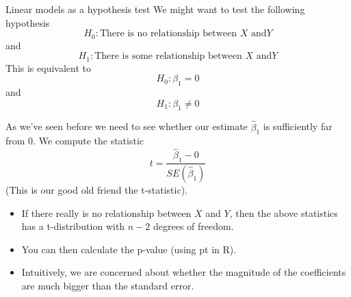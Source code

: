 \documentclass{bredelebeamer}
\begin{document}
\begin{frame}{Linear models as a hypothesis test}
We might want to test the following hypothesis
\begin{equation}
H_0: \text{There is no relationship between } X \text{ and} Y 
\end{equation}
and
\begin{equation}
H_1: \text{There is some relationship between } X \text{ and} Y 
\end{equation}
This is equivalent to 
\begin{equation}
H_0: \beta_1 = 0
\end{equation}
and
\begin{equation}
H_1: \beta_1 \neq 0
\end{equation}
\end{frame}

\begin{frame}
As we've seen before we need to see whether our estimate $\hat{\beta}_1$ is sufficiently far from $0$. We compute the statistic
\begin{equation}
t = \frac{\hat{\beta}_1 - 0 }{SE(\hat{\beta}_1)}
\end{equation}
(This is our good old friend the t-statistic).
\\
\begin{block}
	
\begin{itemize}
\item If there really is no relationship between $X$ and $Y$, then the above statistics has a t-distribution with $n - 2$ degrees of freedom.
\item You can then calculate the p-value (using pt in R).
\item Intuitively, we are concerned about whether the magnitude of the coefficients are much bigger than the standard error.
\end{itemize}
\end{block}
\end{frame}
\end{document}
